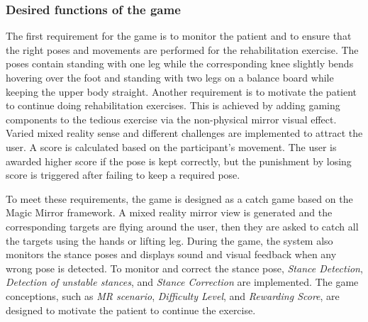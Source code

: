 \subsubsection{Desired functions of the game}
The first requirement for the game is to monitor the patient and to ensure that the right poses and movements are performed for the rehabilitation exercise. The poses contain standing with one leg while the corresponding knee slightly bends hovering over the foot and standing with two legs on a balance board while keeping the upper body straight.
Another requirement is to motivate the patient to continue doing rehabilitation exercises. This is achieved by adding gaming components to the tedious exercise via the non-physical mirror visual effect. Varied mixed reality sense and different challenges are implemented to attract the user. A score is calculated based on the participant's movement. The user is awarded higher score if the pose is kept correctly, but the punishment by losing score is triggered after failing to keep a required pose.

To meet these requirements, the game is designed as a catch game based on the Magic Mirror framework. A mixed reality mirror view is generated and the corresponding targets are flying around the user, then they are asked to catch all the targets using the hands or lifting leg. During the game, the system also monitors the stance poses and displays sound and visual feedback when any wrong pose is detected. To monitor and correct the stance pose, \textit{Stance Detection}, \textit{Detection of unstable stances}, and \textit{Stance Correction} are implemented. The game conceptions, such as \textit{MR scenario}, \textit{Difficulty Level}, and \textit{Rewarding Score}, are designed to motivate the patient to continue the exercise. 

